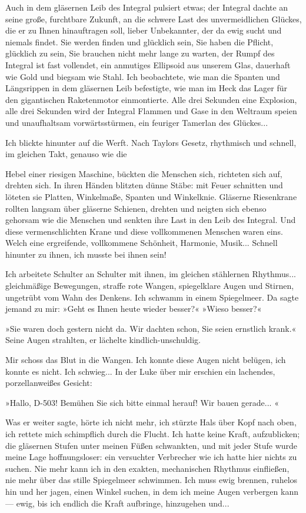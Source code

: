Auch in dem gläsernen Leib des Integral pulsiert etwas; der
Integral dachte an seine große, furchtbare Zukunft, an die schwere
Last des unvermeidlichen Glückes, die er zu Ihnen hinauftragen
soll, lieber Unbekannter, der da ewig sucht und niemals findet. Sie
werden finden und glücklich sein, Sie haben die Pflicht, glücklich
zu sein, Sie brauchen nicht mehr lange zu warten, der Rumpf des
Integral ist fast vollendet, ein anmutiges Ellipsoid aus unserem
Glas, dauerhaft wie Gold und biegsam wie Stahl. Ich beobachtete,
wie man die Spanten und Längsrippen in dem gläsernen Leib
befestigte, wie man im Heck das Lager für den gigantischen
Raketenmotor einmontierte. Alle drei Sekunden eine Explosion, alle
drei Sekunden wird der Integral Flammen und Gase in den Weltraum
speien und unaufhaltsam vorwärtsstürmen, ein feuriger Tamerlan des
Glückes...

Ich blickte hinunter auf die Werft. Nach Taylors Gesetz, rhythmisch
und schnell, im gleichen Takt, genauso wie die

Hebel einer riesigen Maschine, bückten die Menschen sich, richteten
sich auf, drehten sich. In ihren Händen blitzten dünne Stäbe: mit
Feuer schnitten und löteten sie Platten, Winkelmaße, Spanten und
Winkelknie. Gläserne Riesenkrane rollten langsam über gläserne
Schienen, drehten und neigten sich ebenso gehorsam wie die Menschen
und senkten ihre Last in den Leib des Integral. Und diese
vermenschlichten Krane und diese vollkommenen Menschen waren eins.
Welch eine ergreifende, vollkommene Schönheit, Harmonie, Musik...
Schnell hinunter zu ihnen, ich musste bei ihnen sein!

Ich arbeitete Schulter an Schulter mit ihnen, im gleichen
stählernen Rhythmus... gleichmäßige Bewegungen, straffe rote
Wangen, spiegelklare Augen und Stirnen, ungetrübt vom Wahn des
Denkens. Ich schwamm in einem Spiegelmeer. Da sagte jemand zu mir:
»Geht es Ihnen heute wieder besser?« »Wieso besser?«

»Sie waren doch gestern nicht da. Wir dachten schon, Sie seien
ernstlich krank.« Seine Augen strahlten, er lächelte
kindlich-unschuldig.

Mir schoss das Blut in die Wangen. Ich konnte diese Augen nicht
belügen, ich konnte es nicht. Ich schwieg... In der Luke über mir
erschien ein lachendes, porzellanweißes Gesicht:

»Hallo, D-503! Bemühen Sie sich bitte einmal herauf! Wir bauen
gerade... «

Was er weiter sagte, hörte ich nicht mehr, ich stürzte Hals über
Kopf nach oben, ich rettete mich schimpflich durch die Flucht. Ich
hatte keine Kraft, aufzublicken; die gläsernen Stufen unter meinen
Füßen schwankten, und mit jeder Stufe wurde meine Lage
hoffnungsloser: ein versuchter Verbrecher wie ich hatte hier nichts
zu suchen. Nie mehr kann ich in den exakten, mechanischen Rhythmus
einfließen, nie mehr über das stille Spiegelmeer schwimmen. Ich
muss ewig brennen, ruhelos hin und her jagen, einen Winkel suchen,
in dem ich meine Augen verbergen kann — ewig, bis ich endlich die
Kraft aufbringe, hinzugehen und...

